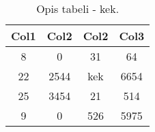\begin{table}[htbp]
\centering
\begin{tabular}{||c c c c||} 
 \hline
 Col1 & Col2 & Col2 & Col3 \\ [0.5ex] 
 \hline\hline
 8 & 0 & 31 & 64   \\
 \hline
 22 & 2544 & kek & 6654  \\
 \hline
 25 & 3454 & 21 & 514 \\
 \hline
 9 & 0 & 526 & 5975 \\
 \hline
\end{tabular}
\label{tab:random_numbers}
\caption{Opis tabeli - kek.}
\end{table}